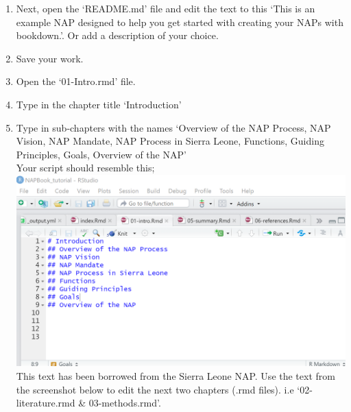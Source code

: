 \documentclass[
]{book}
\providecommand{\tightlist}{%
  \setlength{\itemsep}{0pt}\setlength{\parskip}{0pt}}
\begin{document}
\begin{enumerate}
\def\labelenumi{\arabic{enumi}.}
\setcounter{enumi}{17}
\tightlist
\item
  Next, open the `README.md' file and edit the text to this `This is an example NAP designed to help you get started with creating your NAPs with bookdown.'. Or add a description of your choice.
\item
  Save your work.\\
\item
  Open the `01-Intro.rmd' file.\\
\item
  Type in the chapter title `Introduction'\\
\item
  Type in sub-chapters with the names `Overview of the NAP Process, NAP Vision, NAP Mandate, NAP Process in Sierra Leone, Functions, Guiding Principles, Goals, Overview of the NAP'\\
  Your script should resemble this;
  \includegraphics{tutorial_screenshots/intro_chapter.png}
  This text has been borrowed from the Sierra Leone NAP. Use the text from the screenshot below to edit the next two chapters (.rmd files). i.e `02-literature.rmd \& 03-methods.rmd'.\\

\end{enumerate}
\end{document}
